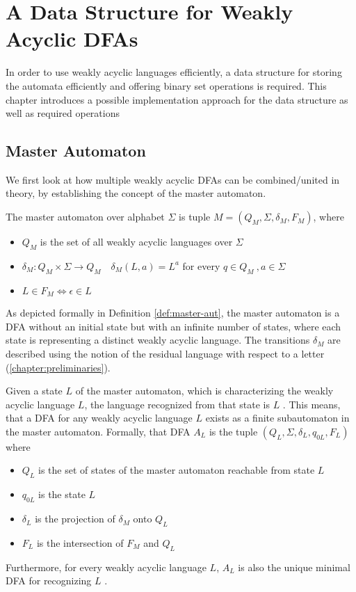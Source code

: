 \chapter{A Data Structure for Weakly Acyclic DFAs}\label{chapter:datastructure}
In order to use weakly acyclic languages efficiently, a data structure for storing the automata efficiently and offering binary set operations is required. This chapter introduces a possible implementation approach for the data structure as well as required operations

\section{Master Automaton}\label{sec:master-aut}
We first look at how multiple weakly acyclic DFAs can be combined/united in theory, by establishing the concept of the master automaton. 
\begin{definition}\label{def:master-aut}
The master automaton over alphabet $\Sigma$ is tuple $M = (Q_{M},\Sigma,\delta_{M},F_{M})$, where 
\begin{itemize}[--,noitemsep]
\item $Q_{M}$ is the set of all weakly acyclic languages over $\Sigma$
\item $\delta_{M}: Q_{M} \times \Sigma \rightarrow Q_{M} \quad \delta_{M}(L,a) = L^{a}$ for every $q \in Q_{M} \ , a \in \Sigma$
\item $L \in F_{M} \iff \epsilon \in L$
\end{itemize}
\end{definition}
As depicted formally in Definition \autoref{def:master-aut}, the master automaton is a DFA without an initial state but with an infinite number of states, where each state is representing a distinct weakly acyclic language. The transitions $\delta_{M}$ are described using the notion of the residual language with respect to a letter (\autoref{chapter:preliminaries}).

\par

Given a state $L$ of the master automaton, which is characterizing the weakly acyclic language $L$, the language recognized from that state is $L$ \cite[Proposition~8]{blondin_24}. This means, that a DFA for any weakly acyclic language $L$ exists as a finite subautomaton in the master automaton. 
\newline
Formally, that DFA $A_{L}$ is the tuple $(Q_{L},\Sigma,\delta_{L},q_{0L},F_{L})$ where 
\begin{itemize}[--,noitemsep]
\item $Q_{L}$ is the set of states of the master automaton reachable from state $L$
\item $q_{0L}$ is the state $L$
\item $\delta_{L}$ is the projection of $\delta_{M}$ onto $Q_{L}$
\item $F_{L}$ is the intersection of $F_{M}$ and $Q_{L}$
\end{itemize}
Furthermore, for every weakly acyclic language $L$, $A_{L}$ is also the unique minimal DFA for recognizing $L$ \cite[Proposition~9]{blondin_24}. 

